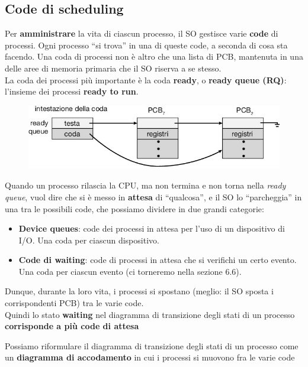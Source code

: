 \subsection{Code di scheduling}
Per \textbf{amministrare} la vita di ciascun processo, il SO gestisce varie \textbf{code} di processi. Ogni processo “si trova” in una di queste code, a seconda di cosa sta facendo.
Una coda di processi non è altro che una lista di PCB, mantenuta in una delle aree di memoria primaria che il SO riserva a se stesso.\\
La coda dei processi più importante è la coda \textbf{ready}, o \textbf{ready queue (RQ)}: l'insieme dei processi \textbf{ready to run}.
\begin{figure}[h]
    \centering
    \includegraphics[width=0.5\linewidth]{images/ready_queue.png}
\end{figure}
Quando un processo rilascia la CPU, ma non termina e non torna nella \textit{ready queue}, vuol dire che si è messo in \textbf{attesa} di “qualcosa”, e il SO lo “parcheggia” in una tra le possibili code, che possiamo dividere in due grandi categorie:
\begin{itemize}
    \item \textbf{Device queues}: code dei processi in attesa per l’uso di un dispositivo di I/O. Una coda per ciascun dispositivo.
    \item \textbf{Code di waiting}: code di processi in attesa che si verifichi un certo evento. Una coda per ciascun evento (ci torneremo nella sezione 6.6).
\end{itemize}
Dunque, durante la loro vita, i processi si spostano (meglio: il SO sposta i corrispondenti PCB) tra le varie code.\\
Quindi lo stato \textbf{waiting} nel diagramma di transizione degli stati di un processo \textbf{corrisponde a più code di attesa}

Possiamo riformulare il diagramma di transizione degli stati di un processo come un \textbf{diagramma di accodamento} in cui i processi si muovono fra le varie code 

